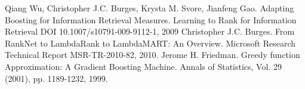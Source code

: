 \documentclass [11pt,a4paper]{article}
\begin{document}
\newpage


\begin{thebibliography}{}
Qiang Wu, Christopher J.C. Burges, Krysta M. Svore, Jianfeng Gao.
Adapting Boosting for Information Retrieval Measures.
Learning to Rank for Information Retrieval DOI 10.1007/s10791-009-9112-1, 2009
Christopher J.C. Burges.
From RankNet to LambdaRank to LambdaMART: An Overview.
Microsoft Research Technical Report MSR-TR-2010-82, 2010.
Jerome H. Friedman.
Greedy function Approximation: A Gradient Boosting Machine.
Annals of Statistics, Vol. 29 (2001), pp. 1189-1232, 1999.
\end{thebibliography}
\end{document}
